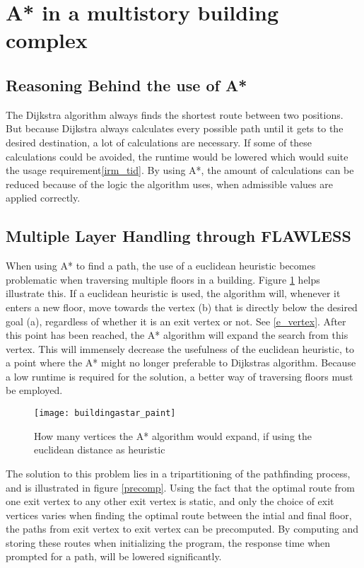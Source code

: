 \section{A* in a multistory building complex}

\subsection{Reasoning Behind the use of A*}
The Dijkstra algorithm always finds the shortest route between two positions. But because Dijkstra always calculates every possible path until it gets to the desired destination, a lot of calculations are necessary. If some of these calculations could be avoided, the runtime would be lowered which would suite the usage requirement\cref{irm_tid}. By using A*, the amount of calculations can be reduced because of the logic the algorithm uses, when admissible values are applied correctly.

\subsection{Multiple Layer Handling through FLAWLESS} \label{multlayhan}

When using A* to find a path, the use of a euclidean heuristic becomes problematic when traversing multiple floors in a building. Figure \ref{fig:buildingAstar} helps illustrate this. If a euclidean heuristic is used, the algorithm will, whenever it enters a new floor, move towards the vertex (b) that is directly below the desired goal (a), regardless of whether it is an exit vertex or not. See \cref{e_vertex}. After this point has been reached, the A* algorithm will expand the search from this vertex. This will immensely decrease the usefulness of the euclidean heuristic, to a point where the A* might no longer preferable to Dijkstras algorithm. Because a low runtime is required for the solution, a better way of traversing floors must be employed.

\begin{figure}[ht!]
    \centering
    \texttt{[image: buildingastar\_paint]}
    \caption{How many vertices the A* algorithm would expand, if using the euclidean distance as heuristic}
    \label{fig:buildingAstar}
  \end{figure}

The solution to this problem lies in a tripartitioning of the pathfinding process, and is illustrated in figure \ref{precomp}. Using the fact that the optimal route from one exit vertex to any other exit vertex is static, and only the choice of exit vertices varies when finding the optimal route between the intial and final floor, the paths from exit vertex to exit vertex can be precomputed. By computing and storing these routes when initializing the program, the response time when prompted for a path, will be lowered significantly.

